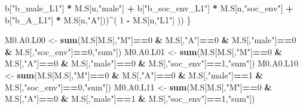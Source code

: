 \documentclass[
]{book}
\newenvironment{Shaded}{\begin{snugshade}}{\end{snugshade}}
\newcommand{\DecValTok}[1]{\textcolor[rgb]{0.00,0.00,0.81}{#1}}
\newcommand{\FunctionTok}[1]{\textcolor[rgb]{0.13,0.29,0.53}{\textbf{#1}}}
\newcommand{\NormalTok}[1]{#1}
\newcommand{\OtherTok}[1]{\textcolor[rgb]{0.56,0.35,0.01}{#1}}
\newcommand{\SpecialCharTok}[1]{\textcolor[rgb]{0.81,0.36,0.00}{\textbf{#1}}}
\newcommand{\StringTok}[1]{\textcolor[rgb]{0.31,0.60,0.02}{#1}}
\begin{document}
\begin{Shaded}
\begin{Highlighting}[]
\NormalTok{                 b[}\StringTok{"b\_male\_L1"}\NormalTok{] }\SpecialCharTok{*}\NormalTok{ M.S[n,}\StringTok{"male"}\NormalTok{] }\SpecialCharTok{+}  
\NormalTok{                 b[}\StringTok{"b\_soc\_env\_L1"}\NormalTok{] }\SpecialCharTok{*}\NormalTok{ M.S[n,}\StringTok{"soc\_env"}\NormalTok{] }\SpecialCharTok{+}
\NormalTok{                 b[}\StringTok{"b\_A\_L1"}\NormalTok{] }\SpecialCharTok{*}\NormalTok{ M.S[n,}\StringTok{"A"}\NormalTok{]))}\SpecialCharTok{\^{}}\NormalTok{( }\DecValTok{1} \SpecialCharTok{{-}}\NormalTok{ M.S[n,}\StringTok{"L1"}\NormalTok{] )) }
\NormalTok{    \}}
  
\NormalTok{  M0.A0.L00 }\OtherTok{\textless{}{-}} \FunctionTok{sum}\NormalTok{(M.S[M.S[,}\StringTok{"M"}\NormalTok{]}\SpecialCharTok{==}\DecValTok{0} \SpecialCharTok{\&}\NormalTok{ M.S[,}\StringTok{"A"}\NormalTok{]}\SpecialCharTok{==}\DecValTok{0} \SpecialCharTok{\&}\NormalTok{ M.S[,}\StringTok{"male"}\NormalTok{]}\SpecialCharTok{==}\DecValTok{0} \SpecialCharTok{\&} 
\NormalTok{                         M.S[,}\StringTok{"soc\_env"}\NormalTok{]}\SpecialCharTok{==}\DecValTok{0}\NormalTok{,}\StringTok{"sum"}\NormalTok{])}
\NormalTok{  M0.A0.L01 }\OtherTok{\textless{}{-}} \FunctionTok{sum}\NormalTok{(M.S[M.S[,}\StringTok{"M"}\NormalTok{]}\SpecialCharTok{==}\DecValTok{0} \SpecialCharTok{\&}\NormalTok{ M.S[,}\StringTok{"A"}\NormalTok{]}\SpecialCharTok{==}\DecValTok{0} \SpecialCharTok{\&}\NormalTok{ M.S[,}\StringTok{"male"}\NormalTok{]}\SpecialCharTok{==}\DecValTok{0} \SpecialCharTok{\&} 
\NormalTok{                         M.S[,}\StringTok{"soc\_env"}\NormalTok{]}\SpecialCharTok{==}\DecValTok{1}\NormalTok{,}\StringTok{"sum"}\NormalTok{])}
\NormalTok{  M0.A0.L10 }\OtherTok{\textless{}{-}} \FunctionTok{sum}\NormalTok{(M.S[M.S[,}\StringTok{"M"}\NormalTok{]}\SpecialCharTok{==}\DecValTok{0} \SpecialCharTok{\&}\NormalTok{ M.S[,}\StringTok{"A"}\NormalTok{]}\SpecialCharTok{==}\DecValTok{0} \SpecialCharTok{\&}\NormalTok{ M.S[,}\StringTok{"male"}\NormalTok{]}\SpecialCharTok{==}\DecValTok{1} \SpecialCharTok{\&} 
\NormalTok{                         M.S[,}\StringTok{"soc\_env"}\NormalTok{]}\SpecialCharTok{==}\DecValTok{0}\NormalTok{,}\StringTok{"sum"}\NormalTok{])}
\NormalTok{  M0.A0.L11 }\OtherTok{\textless{}{-}} \FunctionTok{sum}\NormalTok{(M.S[M.S[,}\StringTok{"M"}\NormalTok{]}\SpecialCharTok{==}\DecValTok{0} \SpecialCharTok{\&}\NormalTok{ M.S[,}\StringTok{"A"}\NormalTok{]}\SpecialCharTok{==}\DecValTok{0} \SpecialCharTok{\&}\NormalTok{ M.S[,}\StringTok{"male"}\NormalTok{]}\SpecialCharTok{==}\DecValTok{1} \SpecialCharTok{\&} 
\NormalTok{                         M.S[,}\StringTok{"soc\_env"}\NormalTok{]}\SpecialCharTok{==}\DecValTok{1}\NormalTok{,}\StringTok{"sum"}\NormalTok{])}
  

\end{Highlighting}
\end{Shaded}
\end{document}
